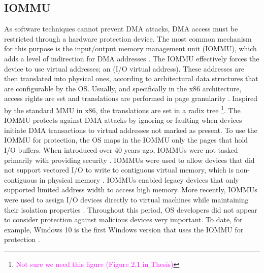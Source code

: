  \subsection{IOMMU}
As software techniques cannot prevent DMA attacks, DMA access must be restricted through a hardware protection device. The most common mechanism for this purpose is the input/output memory management unit (IOMMU), which adds a level of indirection for DMA addresses \cite{WRC08,YZ15,SB12,MTF12}. The IOMMU effectively forces the device to use virtual addresses; an \iova(I/O virtual address). These addresses are then translated into physical ones, according to architectural data structures that are configurable by the OS. Usually, and specifically in the x86 architecture, access rights are set and translations are performed in page granularity \cite{Int16b, AMD16}. Inspired by the standard MMU in x86, the translations are set in a radix tree \footnote{\textcolor{magenta}{Not sure we need this figure (Figure 2.1 in Thesis)}}. The IOMMU protects against DMA attacks by ignoring or faulting when devices initiate DMA transactions to virtual addresses not marked as present. To use the IOMMU for protection, the OS maps in the IOMMU only the pages that hold I/O buffers. When introduced over 40 years ago, IOMMUs were not tasked primarily with providing security \cite{DWT79}. IOMMUs were used to allow devices that did not support vectored I/O to write to contiguous virtual memory, which is non-contiguous in physical memory \cite{Chu96, WMM97}. IOMMUs enabled legacy devices that only supported limited address width to access high memory. More recently, IOMMUs were used to assign I/O devices directly to virtual machines while maintaining their isolation properties \cite{Int16b, AMD16}. Throughout this period, OS developers did not appear to consider protection against malicious devices very important. To date, for example, Windows 10 is the first Windows version that uses the IOMMU for protection \cite{Mic17}.